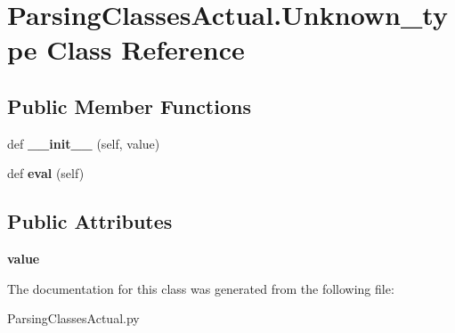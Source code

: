 \hypertarget{class_parsing_classes_actual_1_1_unknown__type}{}\section{Parsing\+Classes\+Actual.\+Unknown\+\_\+type Class Reference}
\label{class_parsing_classes_actual_1_1_unknown__type}
\subsection*{Public Member Functions}
\begin{DoxyCompactItemize}
\item 
\mbox{\label{class_parsing_classes_actual_1_1_unknown__type_ab7bc9b4c235952c48078cba856dcc317}} 
def {\bfseries \+\_\+\+\_\+init\+\_\+\+\_\+} (self, value)
\item 
\mbox{\label{class_parsing_classes_actual_1_1_unknown__type_a7273966f0982773d6904a4318854c787}} 
def {\bfseries eval} (self)
\end{DoxyCompactItemize}
\subsection*{Public Attributes}
\begin{DoxyCompactItemize}
\item 
\mbox{\label{class_parsing_classes_actual_1_1_unknown__type_ade1dc926e512e4485d163e92b6df182d}} 
{\bfseries value}
\end{DoxyCompactItemize}


The documentation for this class was generated from the following file\+:\begin{DoxyCompactItemize}
\item 
Parsing\+Classes\+Actual.\+py\end{DoxyCompactItemize}
